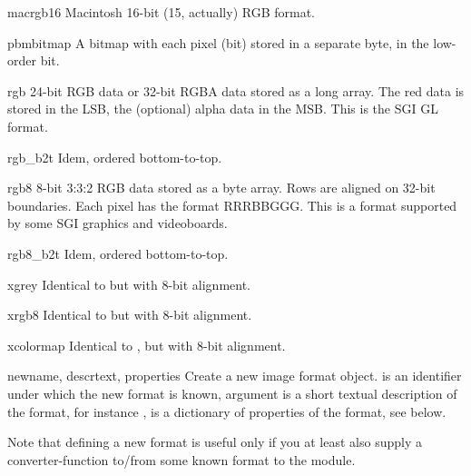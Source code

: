 \begin{datadesc}{macrgb16}
Macintosh 16-bit (15, actually) RGB format.
\end{datadesc}

\begin{datadesc}{pbmbitmap}
A bitmap with each pixel (bit) stored in a separate byte, in the
low-order bit.
\end{datadesc}

\begin{datadesc}{rgb}
24-bit RGB data or 32-bit RGBA data stored as a long array.
The red data is stored in the LSB, the (optional) alpha
data in the MSB. This is the SGI GL format.
\end{datadesc}

\begin{datadesc}{rgb_b2t}
Idem, ordered bottom-to-top.
\end{datadesc}

\begin{datadesc}{rgb8}
8-bit 3:3:2 RGB data stored as a byte array. Rows are
aligned on 32-bit boundaries. Each pixel has the format RRRBBGGG. This
is a format supported by some SGI graphics and videoboards.
\end{datadesc}

\begin{datadesc}{rgb8_b2t}
Idem, ordered bottom-to-top.
\end{datadesc}

\begin{datadesc}{xgrey}
Identical to  but with 8-bit alignment.
\end{datadesc}
\begin{datadesc}{xrgb8}
Identical to  but with 8-bit alignment.
\end{datadesc}
\begin{datadesc}{xcolormap}
Identical to , but with 8-bit alignment.
\end{datadesc}

\begin{funcdesc}{new}{name, descrtext, properties}
Create a new image format object.  is an identifier under
which the new format is known,  argument is a short
textual description of the format, for instance ,  is a dictionary of properties of the
format, see below.
\end{funcdesc}

Note that defining a new format is useful only if you at least also
supply a converter-function to/from some known format to the
 module.

